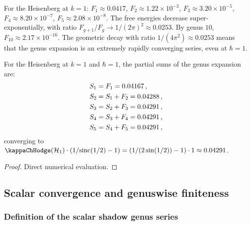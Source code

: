 \begin{remark}
For the Heisenberg at $k = 1$: $F_1 \approx 0.0417$, $F_2 \approx 1.22 \times 10^{-3}$, $F_3 \approx 3.20 \times 10^{-5}$, $F_4 \approx 8.20 \times 10^{-7}$, $F_5 \approx 2.08 \times 10^{-8}$. The free energies decrease super-exponentially, with ratio $F_{g+1}/F_g \to 1/(2\pi)^2 \approx 0.0253$. By genus $10$, $F_{10} \approx 2.17 \times 10^{-16}$. The geometric decay with ratio $1/(4\pi^2) \approx 0.0253$ means that the genus expansion is an extremely rapidly converging series, even at $\hbar = 1$.
\end{remark}

\begin{proposition}
For the Heisenberg at $k = 1$ and $\hbar = 1$, the partial sums of the genus expansion are:
\begin{align}
S_1 &= F_1 = 0.04167\,, \notag \\
S_2 &= S_1 + F_2 = 0.04288\,, \notag \\
S_3 &= S_2 + F_3 = 0.04291\,, \notag \\
S_4 &= S_3 + F_4 = 0.04291\,, \notag \\
S_5 &= S_4 + F_5 = 0.04291\,, %
\end{align}
converging to $\kappaChHodge(\mathcal H_1) \cdot (1/\mathrm{sinc}(1/2) - 1) = (1/(2\sin(1/2)) - 1) \cdot 1 \approx 0.04291$.
\end{proposition}

\begin{proof}
Direct numerical evaluation.
\end{proof}



\subsection{Scalar convergence and genuswise finiteness}
\label{subsec:thqg-I-convergence-grav}

\subsubsection{Definition of the scalar shadow genus series}

